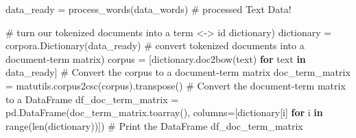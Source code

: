\documentclass[
  letterpaper,
  DIV=11,
  numbers=noendperiod]{scrreprt}
\newenvironment{Shaded}{\begin{snugshade}}{\end{snugshade}}
\newcommand{\BuiltInTok}[1]{\textcolor[rgb]{0.00,0.23,0.31}{#1}}
\newcommand{\CommentTok}[1]{\textcolor[rgb]{0.37,0.37,0.37}{#1}}
\newcommand{\ControlFlowTok}[1]{\textcolor[rgb]{0.00,0.23,0.31}{\textbf{#1}}}
\newcommand{\KeywordTok}[1]{\textcolor[rgb]{0.00,0.23,0.31}{\textbf{#1}}}
\newcommand{\NormalTok}[1]{\textcolor[rgb]{0.00,0.23,0.31}{#1}}
\newcommand{\OperatorTok}[1]{\textcolor[rgb]{0.37,0.37,0.37}{#1}}
\begin{document}
\begin{Shaded}
\begin{Highlighting}[]
\NormalTok{data\_ready }\OperatorTok{=}\NormalTok{ process\_words(data\_words)  }\CommentTok{\# processed Text Data!}
\end{Highlighting}
\end{Shaded}

\begin{Shaded}
\begin{Highlighting}[]
\CommentTok{\# turn our tokenized documents into a term  \textless{}{-}\textgreater{} id dictionary)}
\NormalTok{dictionary }\OperatorTok{=}\NormalTok{ corpora.Dictionary(data\_ready)}
\CommentTok{\# convert tokenized documents into a document{-}term matrix)}
\NormalTok{corpus }\OperatorTok{=}\NormalTok{ [dictionary.doc2bow(text) }\ControlFlowTok{for}\NormalTok{ text }\KeywordTok{in}\NormalTok{ data\_ready]}
\CommentTok{\# Convert the corpus to a document{-}term matrix }
\NormalTok{doc\_term\_matrix }\OperatorTok{=}\NormalTok{ matutils.corpus2csc(corpus).transpose()}
\CommentTok{\# Convert the document{-}term matrix to a DataFrame }
\NormalTok{df\_doc\_term\_matrix }\OperatorTok{=}\NormalTok{ pd.DataFrame(doc\_term\_matrix.toarray(), }
\NormalTok{columns}\OperatorTok{=}\NormalTok{[dictionary[i] }\ControlFlowTok{for}\NormalTok{ i }\KeywordTok{in} \BuiltInTok{range}\NormalTok{(}\BuiltInTok{len}\NormalTok{(dictionary))])}
\CommentTok{\# Print the DataFrame }
\NormalTok{df\_doc\_term\_matrix}
\end{Highlighting}
\end{Shaded}
\end{document}
